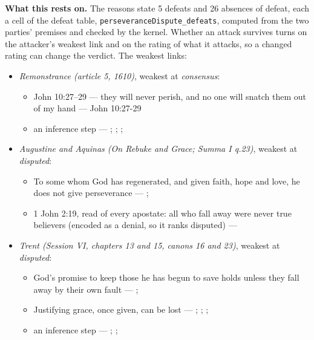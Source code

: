 \documentclass[11pt]{article}
\begin{document}
\par\noindent\textbf{What this rests on.} The reasons state 5 defeats and 26 absences of defeat, each a cell of the defeat table, \texttt{perseverance\allowbreak{}Dispute\_\allowbreak{}defeats}, computed from the two parties' premises and checked by the kernel. Whether an attack survives turns on the attacker's weakest link and on the rating of what it attacks, so a changed rating can change the verdict. The weakest links:
\begin{itemize}
\item \emph{Remonstrance (article 5, 1610)}, weakest at \emph{consensus}:
\begin{itemize}
\item John 10:27–29 — they will never perish, and no one will snatch them out of my hand --- John 10:27-29
\item an inference step --- \cite[548--549]{schaff-creeds-christendom-3-1977}; \cite[603]{arminius-works-1-1825}; \cite[Solid Declaration XI.45]{concordia-triglotta-1921}; \cite[444--445]{wesley-works-9-1827}
\end{itemize}
\item \emph{Augustine and Aquinas (On Rebuke and Grace; Summa I q.23)}, weakest at \emph{disputed}:
\begin{itemize}
\item To some whom God has regenerated, and given faith, hope and love, he does not give perseverance --- \cite[478]{npnf1-05-1887}; \cite[On Rebuke and Grace, ch. 18]{npnf1-05-1887}
\item 1 John 2:19, read of every apostate: all who fall away were never true believers (encoded as a denial, so it ranks disputed) --- \cite[479--480]{npnf1-05-1887}
\end{itemize}
\item \emph{Trent (Session VI, chapters 13 and 15, canons 16 and 23)}, weakest at \emph{disputed}:
\begin{itemize}
\item God’s promise to keep those he has begun to save holds unless they fall away by their own fault --- \cite[Trent, Session VI (1547), ch. 13]{tanner-decrees-1990}; \cite[40]{waterworth-trent-1848}
\item Justifying grace, once given, can be lost --- \cite[Trent, Session VI (1547), ch. 15]{tanner-decrees-1990}; \cite[42]{waterworth-trent-1848}; \cite[Trent, Session VI (1547), canon 23]{tanner-decrees-1990}; \cite[47]{waterworth-trent-1848}
\item an inference step --- \cite[329--330]{calvin-corinthians-1-1848}; \cite[Trent, Session VI (1547), ch. 13]{tanner-decrees-1990}; \cite[40--41]{waterworth-trent-1848}

\end{itemize}
\end{itemize}
\end{document}

